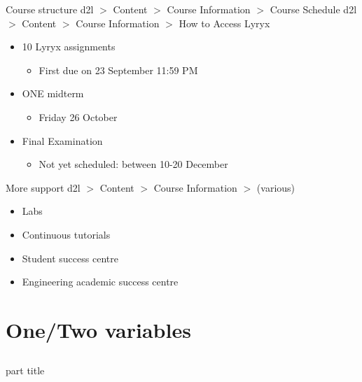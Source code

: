 \documentclass{beamer}
\begin{document}
\begin{frame}{Course structure}
  d2l $>$ Content $>$ Course Information $>$ Course Schedule\vfill
  d2l $>$ Content $>$ Course Information $>$ How to Access Lyryx\vfill
  \begin{itemize}
  \item 10 Lyryx assignments
    \begin{itemize}
    \item First due on 23 September 11:59 PM
    \end{itemize}\vfill
  \item ONE midterm
    \begin{itemize}
    \item Friday 26 October
    \end{itemize}\vfill
  \item Final Examination
    \begin{itemize}
    \item Not yet scheduled: between 10-20 December
    \end{itemize}\vfill
  \end{itemize}
\end{frame}

\begin{frame}{More support}
  d2l $>$ Content $>$ Course Information $>$ (various)\vfill
  \begin{itemize}
  \item Labs\vfill
  \item Continuous tutorials\vfill
  \item Student success centre\vfill
  \item Engineering academic success centre
  \end{itemize}
\end{frame}

\section{One/Two variables}
\subsection{}

\begin{frame}
    \begin{beamercolorbox}[sep=12pt,center]{part title}
      \insertsection\par
    \end{beamercolorbox}
\end{frame}
\end{document}
